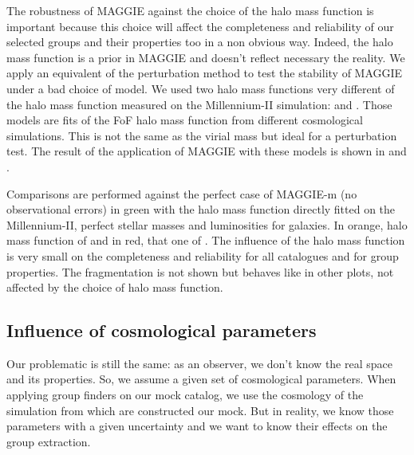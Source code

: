 The robustness of MAGGIE against the choice of the halo mass function is
important because this choice will affect the completeness and reliability of
our selected groups and their properties too in a non obvious way. Indeed, the
halo mass function is a prior in MAGGIE and doesn't reflect necessary the
reality. We apply an equivalent of the perturbation method to test the
stability of MAGGIE under a bad choice of model. We used two halo mass
functions very different of the halo mass function measured on the
Millennium-II simulation: \citet{Warren+06} and \citet{Courtin+11}. Those
models are fits of the FoF halo mass function from different cosmological
simulations. This is not the same as the virial mass but ideal for a
perturbation test. The result of the application of MAGGIE with these models is
shown in  and .

Comparisons are performed against the perfect case of MAGGIE-m (no
observational errors) in green with the halo mass function directly fitted on
the Millennium-II, perfect stellar masses and luminosities for galaxies. In
orange, halo mass function of \citet{Warren+06} and in red, that one of
\citet{Courtin+11}. The influence of the halo mass function is very small on
the completeness and reliability for all catalogues and for group properties.
The fragmentation is not shown but behaves like in other plots, not affected by
the choice of halo mass function.

\subsection{Influence of cosmological parameters}

Our problematic is still the same: as an observer, we don't know the real space
and its properties. So, we assume a given set of cosmological parameters. When
applying group finders on our mock catalog, we use the cosmology of the
simulation from which are constructed our mock. But in reality, we know those
parameters with a given uncertainty and we want to know their effects on the
group extraction.

